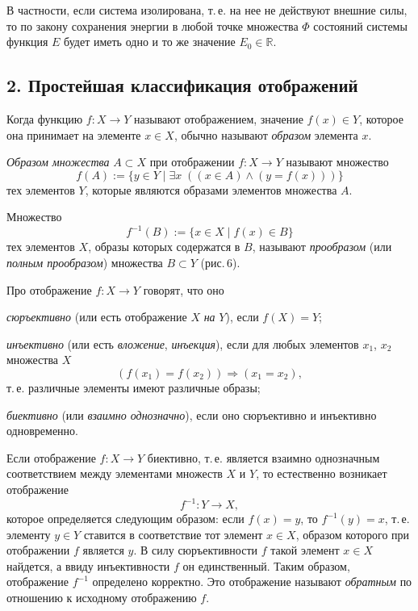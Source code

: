 В частности, если система изолирована, т.\,е. на нее не действуют внешние силы, то по закону сохранения энергии в любой точке множества $\Phi$
состояний системы функция $E$ будет иметь одно и то же значение $E_0 \in \mathbb{R}$.

\subsection*{2. Простейшая классификация отображений}

Когда функцию $f \colon X \to Y$ называют отображением, значение $f(x) \in Y$, которое она принимает на
элементе $x \in X$, обычно называют \textit{образом} элемента $x$.

\textit{Образом множества} $A \subset X$ при отображении $f \colon X \to Y$ называют множество
\[
  f(A) := \{ y \in Y \mid \exists x\; ((x \in A) \land (y = f(x))) \}
\]
тех элементов $Y$, которые являются образами элементов множества $A$.

Множество
\[
  f^{-1}(B) := \{ x \in X \mid f(x) \in B \}
\]
тех элементов $X$, образы которых содержатся в $B$, называют \textit{прообразом} (или
\textit{полным прообразом}) множества $B \subset Y$ (рис.\,6).


Про отображение $f \colon X \to Y$ говорят, что оно

\textit{сюръективно} (или есть отображение $X$ \textit{на} $Y$), если $f(X) = Y$;

\textit{инъективно} (или есть \textit{вложение}, \textit{инъекция}), если для любых элементов $x_1$,
$x_2$ множества $X$
\[
  (f(x_1) = f(x_2)) \Rightarrow (x_1 = x_2),
\]
т.\,е. различные элементы имеют различные образы;

\textit{биективно} (или \textit{взаимно однозначно}), если оно сюръективно и инъективно одновременно.

Если отображение $f \colon X \to Y$ биективно, т.\,е. является взаимно однозначным соответствием между элементами множеств $X$ и $Y$, то естественно возникает отображение
\[
  f^{-1} \colon Y \to X,
\]
которое определяется следующим образом: если $f(x) = y$, то $f^{-1}(y) = x$, т.\,е.
элементу $y \in Y$ ставится в соответствие тот элемент $x \in X$, образом которого при отображении $f$ является $y$. В силу сюръективности $f$ такой элемент
$x \in X$ найдется, а ввиду инъективности $f$ он единственный. Таким образом,
отображение $f^{-1}$ определено корректно. Это отображение называют \textit{обратным} по отношению к исходному отображению $f$.

